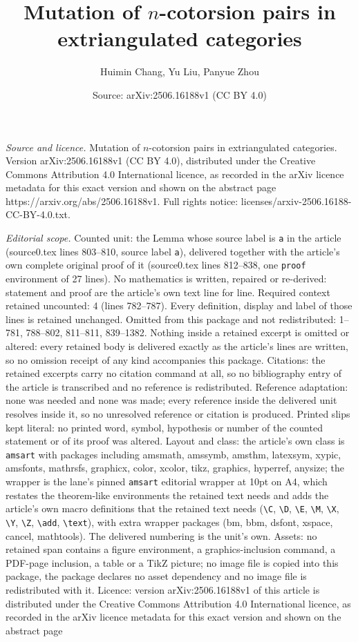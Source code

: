 \documentclass[10pt,a4paper]{amsart}
\title[Mutation of $n$-cotorsion pairs in extriangulated categories]{Mutation of $n$-cotorsion pairs in extriangulated categories}
\author{Huimin Chang, Yu Liu, Panyue Zhou}
\date{Source: arXiv:2506.16188v1 (CC BY 4.0)}
\begin{document}
\maketitle

\noindent\emph{Source and licence.} Mutation of $n$-cotorsion pairs in extriangulated categories. Version arXiv:2506.16188v1 (CC BY 4.0), distributed under the Creative Commons Attribution 4.0 International licence, as recorded in the arXiv licence metadata for this exact version and shown on the abstract page https://arxiv.org/abs/2506.16188v1. Full rights notice: licenses/arxiv-2506.16188-CC-BY-4.0.txt.\par\smallskip

\noindent\textit{Editorial scope.} Counted unit: the Lemma whose source label is \texttt{a} in the article (source0.tex lines 803--810, source label \texttt{a}), delivered together with the article's own complete original proof of it (source0.tex lines 812--838, one \texttt{proof} environment of 27 lines). No mathematics is written, repaired or re-derived: statement and proof are the article's own text line for line. Required context retained uncounted: 4 (lines 782--787). Every definition, display and label of those lines is retained unchanged. Omitted from this package and not redistributed: 1--781, 788--802, 811--811, 839--1382. Nothing inside a retained excerpt is omitted or altered: every retained body is delivered exactly as the article's lines are written, so no omission receipt of any kind accompanies this package. Citations: the retained excerpts carry no citation command at all, so no bibliography entry of the article is transcribed and no reference is redistributed. Reference adaptation: none was needed and none was made; every reference inside the delivered unit resolves inside it, so no unresolved reference or citation is produced. Printed slips kept literal: no printed word, symbol, hypothesis or number of the counted statement or of its proof was altered. Layout and class: the article's own class is \texttt{amsart} with packages including amsmath, amssymb, amsthm, latexsym, xypic, amsfonts, mathrsfs, graphicx, color, xcolor, tikz, graphics, hyperref, anysize; the wrapper is the lane's pinned \texttt{amsart} editorial wrapper at 10pt on A4, which restates the theorem-like environments the retained text needs and adds the article's own macro definitions that the retained text needs (\texttt{\textbackslash C}, \texttt{\textbackslash D}, \texttt{\textbackslash E}, \texttt{\textbackslash M}, \texttt{\textbackslash X}, \texttt{\textbackslash Y}, \texttt{\textbackslash Z}, \texttt{\textbackslash add}, \texttt{\textbackslash text}), with extra wrapper packages (bm, bbm, dsfont, xspace, cancel, mathtools). The delivered numbering is the unit's own. Assets: no retained span contains a figure environment, a graphics-inclusion command, a PDF-page inclusion, a table or a TikZ picture; no image file is copied into this package, the package declares no asset dependency and no image file is redistributed with it. Licence: version arXiv:2506.16188v1 of this article is distributed under the Creative Commons Attribution 4.0 International licence, as recorded in the arXiv licence metadata for this exact version and shown on the abstract page 
\end{document}
